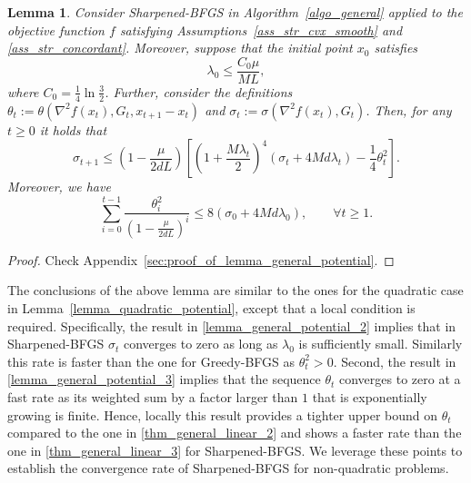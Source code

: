 \documentclass[11pt]{article}
\numberwithin{assumption}{section}
\numberwithin{remark}{section}
\numberwithin{theorem}{section}
\newtheorem{lemma}[theorem]{Lemma}
\begin{document}
\begin{lemma}\label{lemma_general_potential}
Consider Sharpened-BFGS in Algorithm~\ref{algo_general} applied to the objective function $f$ satisfying Assumptions~\ref{ass_str_cvx_smooth} and \ref{ass_str_concordant}. Moreover, suppose that the initial point $x_0$ satisfies 
\begin{equation}\label{lemma_general_potential_1}
\lambda_0 \leq \frac{C_0\mu}{ML}, 
\end{equation}
where $ C_0 = \frac{1}{4}\ln{\frac{3}{2}}$.
Further, consider the definitions  $\theta_t := \theta(\nabla^2{f(x_{t})}, G_t, x_{t + 1} - x_{t})$ and $\sigma_t := \sigma(\nabla^2{f(x_{t})}, G_{t})$. Then, for any $t \geq 0$ it holds that
\begin{equation}\label{lemma_general_potential_2}
    \sigma_{t+1} \leq (1 - \frac{\mu}{2dL})\left[(1 + \frac{M\lambda_t}{2})^4(\sigma_t + 4Md\lambda_t) - \frac{1}{4}\theta^2_t\right].
\end{equation}
Moreover, we have 
\begin{equation}\label{lemma_general_potential_3}
    \sum_{i = 0}^{t - 1}\frac{\theta^2_i}{(1 - \frac{\mu}{2d L})^{i}}  \leq 8(\sigma_0 + 4Md\lambda_0), \qquad \forall t \geq 1. 
\end{equation}
\end{lemma}
\vspace{-2mm}
\begin{proof}
Check Appendix~\ref{sec:proof_of_lemma_general_potential}.
\end{proof}

The conclusions of the above lemma are similar to the ones for the quadratic case in Lemma~\ref{lemma_quadratic_potential}, except that a local condition is required.
Specifically, the result in \eqref{lemma_general_potential_2} implies that in Sharpened-BFGS $\sigma_t$ converges to zero as long as $\lambda_0$ is sufficiently small. Similarly this rate is faster than the one for Greedy-BFGS as  $\theta^2_t > 0$. Second, the result in \eqref{lemma_general_potential_3} implies that the sequence $\theta_t$ converges to zero at a fast rate as its weighted sum by a factor larger than $1$ that is exponentially growing is finite. Hence, locally this result provides a tighter upper bound on $\theta_t$ compared to the one in \eqref{thm_general_linear_2} and shows  a faster rate than the one in \eqref{thm_general_linear_3} for Sharpened-BFGS. We leverage these points to establish the convergence rate of Sharpened-BFGS for non-quadratic problems.
\end{document}

